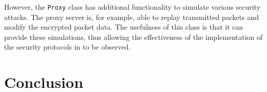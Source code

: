 \documentclass[a4paper,11pt]{article}
\begin{document}
However, the \verb+Proxy+ class has additional functionality to simulate 
various security attacks. The proxy server is, for example, able to replay 
transmitted packets and modify the encrypted packet data. The usefulness of this
class is that it can provide these simulations, thus allowing the effectiveness
of the implementation of the security protocols in \serviceName{} to be 
observed.

\section{Conclusion}
\end{document}
